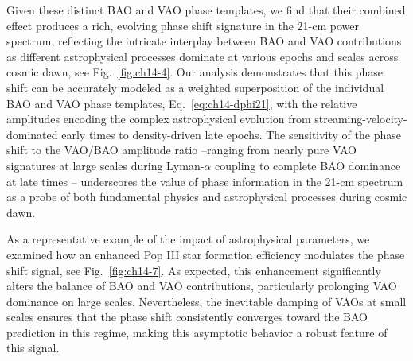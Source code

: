 Given these distinct BAO and VAO phase templates, we find that their combined effect produces a rich, evolving phase shift signature in the 21-cm power spectrum, reflecting the intricate interplay between BAO and VAO contributions as different astrophysical processes dominate at various epochs and scales across cosmic dawn, see Fig.~\ref{fig:ch14-4}. Our analysis demonstrates that this phase shift can be accurately modeled as a weighted superposition of the individual BAO and VAO phase templates, Eq.~\eqref{eq:ch14-dphi21}, with the relative amplitudes encoding the complex astrophysical evolution from streaming-velocity-dominated early times to density-driven late epochs. The sensitivity of the phase shift to the VAO/BAO amplitude ratio --ranging from nearly pure VAO signatures at large scales during Lyman-$\alpha$ coupling to complete BAO dominance at late times -- underscores the value of phase information in the 21-cm spectrum as a probe of both fundamental physics and astrophysical processes during cosmic dawn.

As a representative example of the impact of astrophysical parameters, we examined how an enhanced Pop III star formation efficiency modulates the phase shift signal, see Fig.~\ref{fig:ch14-7}. As expected, this enhancement significantly alters the balance of BAO and VAO contributions, particularly prolonging VAO dominance on large scales. Nevertheless, the inevitable damping of VAOs at small scales ensures that the phase shift consistently converges toward the BAO prediction in this regime, making this asymptotic behavior a robust feature of this signal.



